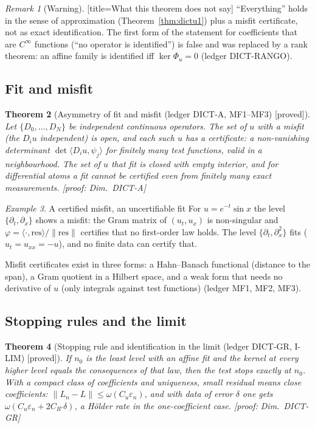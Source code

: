 \documentclass[11pt]{article}
\theoremstyle{plain}
\newtheorem{theorem}{Theorem}[section]
\theoremstyle{definition}
\theoremstyle{remark}
\newtheorem{remark}[theorem]{Remark}
\newtheorem{example}[theorem]{Example}
\newcommand{\badge}[2]{\textcolor{#1}{\textsf{\footnotesize[#2]}}}
\newcommand{\proved}[1][]{\badge{cC}{proved#1}}
\newcommand{\led}[1]{\textcolor{cG}{\textsf{\footnotesize(ledger #1)}}}
\newenvironment{caution}{\begin{remark}[Warning]}{\end{remark}}
\newcommand{\dimref}[1]{\textsf{\footnotesize[proof: Dim.~#1]}}
\begin{document}
\begin{caution}[title=What this theorem does not say]
``Everything'' holds in the sense of approximation (Theorem~\ref{thm:dictu1}) plus a misfit certificate, not as exact identification. The first form of the statement for coefficients that are $C^\infty$ functions (``no operator is identified'') is false and was replaced by a rank theorem: an affine family is identified iff $\ker\Phi_u=0$ \led{DICT-RANGO}.
\end{caution}

\subsection{Fit and misfit}

\begin{theorem}[{Asymmetry of fit and misfit \led{DICT-A, MF1--MF3} \proved}]\label{thm:dicta}
Let $\{D_0,\dots,D_N\}$ be independent continuous operators. The set of $u$ with a \emph{misfit} (the $D_iu$ independent) is open, and each such $u$ has a certificate: a non-vanishing determinant $\det\langle D_iu,\psi_j\rangle$ for finitely many test functions, valid in a neighbourhood. The set of $u$ that \emph{fit} is closed with empty interior, and for differential atoms a fit cannot be certified even from finitely many \emph{exact} measurements.
\dimref{DICT-A}
\end{theorem}

\begin{example}{A certified misfit, an uncertifiable fit}
For $u=e^{-t}\sin x$ the level $\{\partial_t,\partial_x\}$ shows a misfit: the Gram matrix of $(u_t,u_x)$ is non-singular and $\varphi=\langle\cdot,\mathrm{res}\rangle/\|\mathrm{res}\|$ certifies that no first-order law holds. The level $\{\partial_t,\partial_x^2\}$ fits ($u_t=u_{xx}=-u$), and no finite data can certify that.
\end{example}

Misfit certificates exist in three forms: a Hahn--Banach functional (distance to the span), a Gram quotient in a Hilbert space, and a weak form that needs no derivative of $u$ (only integrals against test functions) \led{MF1, MF2, MF3}.

\subsection{Stopping rules and the limit}

\begin{theorem}[{Stopping rule and identification in the limit \led{DICT-GR, I-LIM} \proved}]\label{thm:dictgr}
If $n_0$ is the least level with an affine fit and the kernel at every higher level equals the consequences of that law, then the test stops exactly at $n_0$. With a compact class of coefficients and uniqueness, small residual means close coefficients: $\|L_n-L\|\le\omega(C_u\varepsilon_n)$, and with data of error $\delta$ one gets $\omega(C_u\varepsilon_n+2C_{R'}\delta)$, a H\"older rate in the one-coefficient case.
\dimref{DICT-GR}
\end{theorem}
\end{document}
